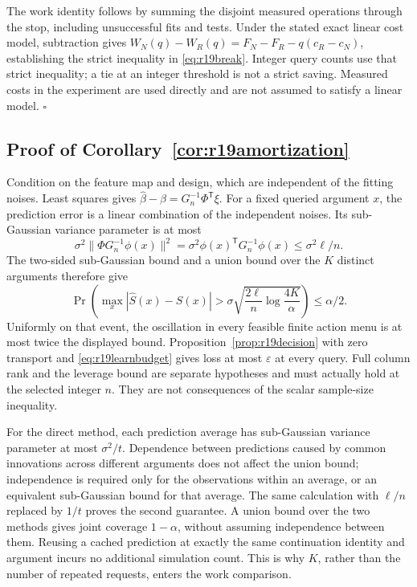 \documentclass[ecta,nameyear,draft]{econsocart}
\theoremstyle{definition}
\theoremstyle{remark}
\begin{document}
The work identity follows by summing the disjoint measured operations through
the stop, including unsuccessful fits and tests. Under the stated exact
linear cost model, subtraction gives
$W_N(q)-W_R(q)=F_N-F_R-q(c_R-c_N)$, establishing the strict inequality
in \eqref{eq:r19break}. Integer query counts use that strict inequality;
a tie at an integer threshold is not a strict saving. Measured costs in the
experiment are used directly and are not assumed to satisfy a linear model.
\hfill$\square$

\subsection{Proof of Corollary~\ref{cor:r19amortization}}
Condition on the feature map and design, which are independent of the fitting
noises. Least squares gives
$\widehat\beta-\beta=G_n^{-1}\Phi^{\mathsf T}\xi$.
For a fixed queried argument $x$, the prediction error is a linear combination
of the independent noises. Its sub-Gaussian variance parameter is at most
\[
 \sigma^2\|\Phi G_n^{-1}\phi(x)\|^2
 =\sigma^2\phi(x)^{\mathsf T}G_n^{-1}\phi(x)
 \leq\sigma^2\ell/n.
\]
The two-sided sub-Gaussian bound and a union bound over the $K$ distinct
arguments therefore give
\[
 \Pr\left(\max_x|\widehat S(x)-S(x)|>
  \sigma\sqrt{\frac{2\ell}{n}\log\frac{4K}{\alpha}}\right)
 \leq\alpha/2.
\]
Uniformly on that event, the oscillation in every feasible finite action
menu is at most twice the displayed bound. Proposition~\ref{prop:r19decision}
with zero transport and \eqref{eq:r19learnbudget} gives loss at most
$\varepsilon$ at every query. Full column rank and the leverage bound are
separate hypotheses and must actually hold at the selected integer $n$.
They are not consequences of the scalar sample-size inequality.

For the direct method, each prediction average has sub-Gaussian variance
parameter at most $\sigma^2/t$. Dependence between predictions caused by
common innovations across different arguments does not affect the union
bound; independence is required only for the observations within an average,
or an equivalent sub-Gaussian bound for that average. The same calculation
with $\ell/n$ replaced by $1/t$ proves the second guarantee. A union bound
over the two methods gives joint coverage $1-\alpha$, without assuming
independence between them. Reusing a cached prediction at exactly the same
continuation identity and argument incurs no additional simulation count.
This is why $K$, rather than the number of repeated requests, enters the
work comparison.
\end{document}
